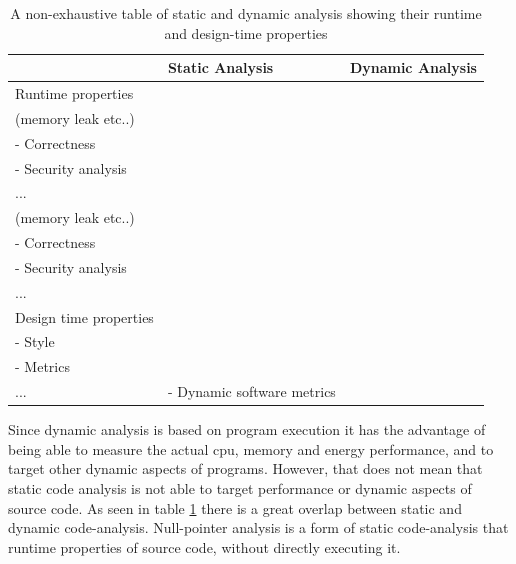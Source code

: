 \documentclass[pdftex,10pt,b5paper,twoside]{report}
\begin{document}
\begin{table}[h!]
\centering
\begin{tabularx}{\textwidth}{|X|X|X|}
\hline
                                & Static Analysis                                                                                        & Dynamic Analysis                                                                                       \\ \hline
Runtime properties     & \begin{tabular}[c]{@{}l@{}}- Performance \\(memory leak etc..)\\ - Correctness\\ - Security analysis\\ ...\end{tabular} & \begin{tabular}[c]{@{}l@{}}- Performance \\(memory leak etc..)\\ - Correctness\\ - Security analysis\\ ...\end{tabular} \\ \hline
Design time properties & \begin{tabular}[c]{@{}l@{}}- Design principles \\ - Style\\ - Metrics\\ ...\end{tabular}                              & - Dynamic software metrics                                                                                            \\ \hline
\end{tabularx}
\caption{A non-exhaustive table of static and dynamic analysis showing their runtime and design-time properties}
\label{table:static-dynamic}
\end{table}

Since dynamic analysis is based on program execution it has the advantage of being able to measure the actual \gls{cpu}, memory and energy performance, and to target other dynamic aspects of programs. However, that does not mean that static code analysis is not able to target performance or dynamic aspects of source code. As seen in table \ref{table:static-dynamic} there is a great overlap between static and dynamic code-analysis. Null-pointer analysis is a form of static code-analysis that runtime properties of source code, without directly executing it.
\end{document}
